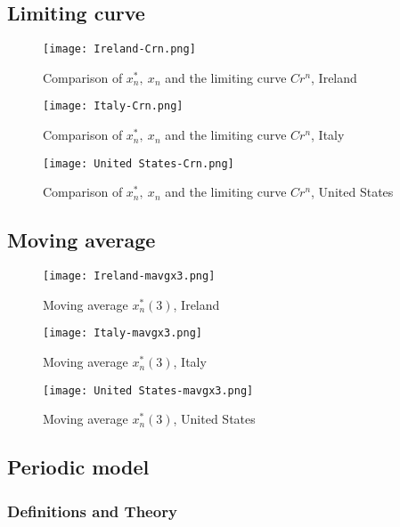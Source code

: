 \subsection{Limiting curve}

\begin{figure}[H]
\texttt{[image: Ireland-Crn.png]}
\endminipage 
\caption{Comparison of $x^*_n,\ x_n$ and the limiting curve $Cr^n$, Ireland}
\end{figure}

\begin{figure}[H]
\texttt{[image: Italy-Crn.png]}
\endminipage 
\caption{Comparison of $x^*_n,\ x_n$ and the limiting curve $Cr^n$, Italy}
\end{figure}

\begin{figure}[H]
\texttt{[image: United States-Crn.png]}
\endminipage 
\caption{Comparison of $x^*_n,\ x_n$ and the limiting curve $Cr^n$, United States}
\end{figure}

\subsection{Moving average}

\begin{figure}[H]
\texttt{[image: Ireland-mavgx3.png]}
\endminipage 
\caption{Moving average $x^*_n (3)$, Ireland}
\end{figure}

\begin{figure}[H]
\texttt{[image: Italy-mavgx3.png]}
\endminipage 
\caption{Moving average $x^*_n (3)$, Italy}
\end{figure}

\begin{figure}[H]
\texttt{[image: United States-mavgx3.png]}
\endminipage 
\caption{Moving average $x^*_n (3)$, United States}
\end{figure}

\subsection{Periodic model}

\subsubsection{Definitions and Theory}

